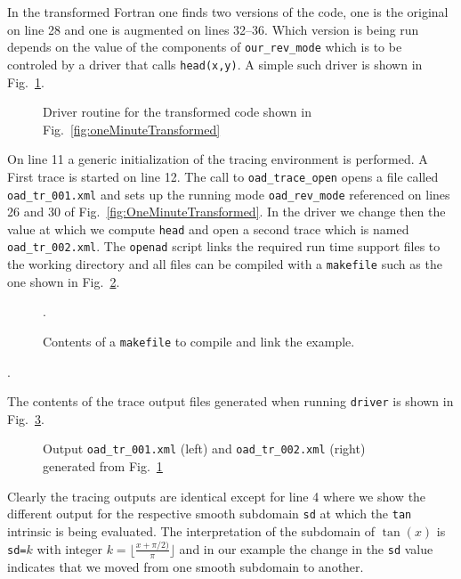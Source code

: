 \documentclass{article}
\newcommand{\reffig}[1]{{Fig.~\ref{#1}}}
\begin{document}
In the transformed Fortran one finds two versions of the code, one is the original 
on line 28 and one is augmented on lines 32--36. Which version is being run depends 
on the value of the components of \lstinline{our_rev_mode} which is to be controled 
by a driver that calls \lstinline{head(x,y)}.
A simple such driver is shown in \reffig{fig:oneMinuteDriver}. 
\begin{figure}

\caption{Driver routine for the transformed code  shown in \reffig{fig:oneMinuteTransformed}}\label{fig:oneMinuteDriver}
\end{figure}
On line 11 a generic initialization of the tracing environment is performed.  A First trace is 
started on line 12. The call to \lstinline{oad_trace_open} opens a file called 
\lstinline{oad_tr_001.xml} and sets up the running mode \lstinline{oad_rev_mode} 
referenced on lines 26 and 30 of \reffig{fig:OneMinuteTransformed}.
In the driver we change then the value at which we compute \lstinline{head} and 
open a second trace which is named \lstinline{oad_tr_002.xml}. 
The \lstinline{openad} script links the required run time support files 
to the working directory and all files can be compiled with 
a \lstinline{makefile} such as the one shown in \reffig{fig:OneMinuteMake}.
\begin{figure}
\hspace*{.5cm}\begin{minipage}{\textwidth}
\scriptsize{}
\end{minipage}
\caption{Contents of a \lstinline{makefile} to compile and link the example.}\label{fig:OneMinuteMake}.
\end{figure}.

The contents of the trace output files generated when running \lstinline{driver} 
is shown in \reffig{fig:OneMinuteXMLOutput}.
\begin{figure}
\begin{minipage}{.5\textwidth}

\end{minipage}
\begin{minipage}{.5\textwidth}

\end{minipage}
\caption{Output \lstinline{oad_tr_001.xml} (left) 
and \lstinline{oad_tr_002.xml} (right) 
generated from \reffig{fig:oneMinuteDriver}}\label{fig:OneMinuteXMLOutput}
\end{figure}
Clearly the tracing outputs are identical except for line 4 where we show the 
different output for the respective smooth subdomain \lstinline{sd} at which the 
\lstinline{tan} intrinsic is being evaluated. The interpretation of the subdomain of $\tan(x)$ 
is \lstinline{sd=}$k$ with integer $k=\lfloor\frac{x+\pi/2)}{\pi}\rfloor$ and in our 
example the change in the \lstinline{sd} value  indicates that we moved from one smooth 
subdomain to another. 
\end{document}
